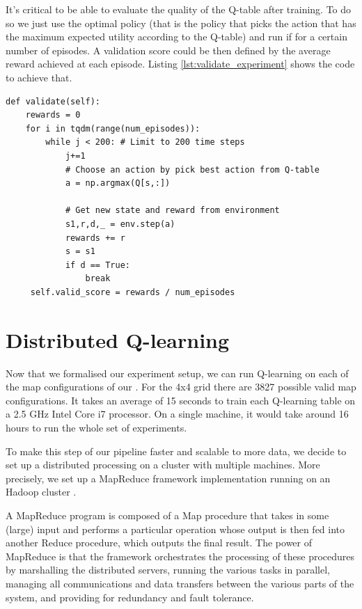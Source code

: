 It's critical to be able to evaluate the quality of the Q-table after training. To do so we just use the optimal policy (that is the policy that picks the action that has the maximum expected utility according to the Q-table) and run if for a certain number of episodes. A validation score could be then defined by the average reward achieved at each episode. Listing \ref{lst:validate_experiment} shows the code to achieve that.

\begin{minipage}{\linewidth}
\lstset{language=Python}
\lstset{frame=lines}
\lstset{basicstyle=\footnotesize}
\begin{lstlisting}
def validate(self):
	rewards = 0
    for i in tqdm(range(num_episodes)):
        while j < 200: # Limit to 200 time steps
            j+=1
            # Choose an action by pick best action from Q-table
            a = np.argmax(Q[s,:])
            
            # Get new state and reward from environment
            s1,r,d,_ = env.step(a)
            rewards += r
            s = s1
            if d == True:
                break
     self.valid_score = rewards / num_episodes
\end{lstlisting}
\end{minipage}


\section{Distributed Q-learning}
Now that we formalised our experiment setup, we can run Q-learning on each of the map configurations of our . For the 4x4 grid there are 3827 possible valid map configurations. It takes an average of 15 seconds to train each Q-learning table on a 2.5 GHz Intel Core i7 processor. On a single machine, it would take around 16 hours to run the whole set of experiments.

To make this step of our pipeline faster and scalable to more data, we decide to set up a distributed processing on a cluster with multiple machines. More precisely, we set up a MapReduce framework \parencite{Dean:2004:MSD:1251254.1251264} implementation running on an Hadoop cluster \parencite{shvachko2010hadoop}.

A MapReduce program is composed of a Map procedure that takes in some (large) input and performs a particular operation whose output is then fed into another Reduce procedure, which outputs the final result. The power of MapReduce is that the framework orchestrates the processing of these procedures by marshalling the distributed servers, running the various tasks in parallel, managing all communications and data transfers between the various parts of the system, and providing for redundancy and fault tolerance.

